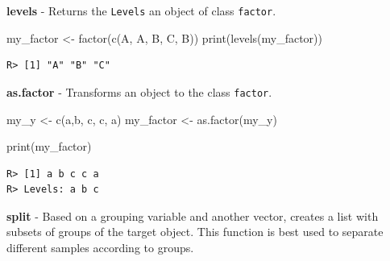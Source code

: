 \documentclass[
  12pt,
]{book}
\newenvironment{Shaded}{\begin{snugshade}}{\end{snugshade}}
\newcommand{\FunctionTok}[1]{\textcolor[rgb]{0,0,0}{#1}}
\newcommand{\NormalTok}[1]{#1}
\newcommand{\OtherTok}[1]{\textcolor[rgb]{0.37,0.37,0.37}{#1}}
\newcommand{\StringTok}[1]{\textcolor[rgb]{0.5,0.5,0.5}{#1}}
\begin{document}
\textbf{levels} - Returns the \texttt{Levels} an object of class \texttt{factor}. 

\begin{Shaded}
\begin{Highlighting}[]
\NormalTok{my\_factor }\OtherTok{\textless{}{-}} \FunctionTok{factor}\NormalTok{(}\FunctionTok{c}\NormalTok{(}\StringTok{\textquotesingle{}A\textquotesingle{}}\NormalTok{, }\StringTok{\textquotesingle{}A\textquotesingle{}}\NormalTok{, }\StringTok{\textquotesingle{}B\textquotesingle{}}\NormalTok{, }\StringTok{\textquotesingle{}C\textquotesingle{}}\NormalTok{, }\StringTok{\textquotesingle{}B\textquotesingle{}}\NormalTok{))}
\FunctionTok{print}\NormalTok{(}\FunctionTok{levels}\NormalTok{(my\_factor))}
\end{Highlighting}
\end{Shaded}

\begin{verbatim}
R> [1] "A" "B" "C"
\end{verbatim}

\textbf{as.factor} - Transforms an object to the class \texttt{factor}. 

\begin{Shaded}
\begin{Highlighting}[]
\NormalTok{my\_y }\OtherTok{\textless{}{-}} \FunctionTok{c}\NormalTok{(}\StringTok{\textquotesingle{}a\textquotesingle{}}\NormalTok{,}\StringTok{\textquotesingle{}b\textquotesingle{}}\NormalTok{, }\StringTok{\textquotesingle{}c\textquotesingle{}}\NormalTok{, }\StringTok{\textquotesingle{}c\textquotesingle{}}\NormalTok{, }\StringTok{\textquotesingle{}a\textquotesingle{}}\NormalTok{)}
\NormalTok{my\_factor }\OtherTok{\textless{}{-}} \FunctionTok{as.factor}\NormalTok{(my\_y)}

\FunctionTok{print}\NormalTok{(my\_factor)}
\end{Highlighting}
\end{Shaded}

\begin{verbatim}
R> [1] a b c c a
R> Levels: a b c
\end{verbatim}

\textbf{split} - Based on a grouping variable and another vector, creates a list with subsets of groups of the target object. This function is best used to separate different samples according to groups. 
\end{document}
